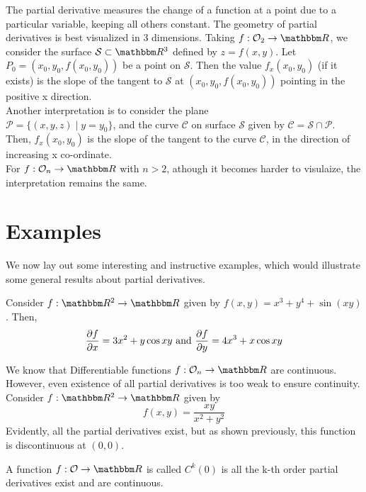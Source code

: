 \documentclass[../Analysis-3]{subfiles}
\begin{document}
The partial derivative measures the change of a function at a point due to a particular variable, keeping all others constant. The geometry of partial derivatives is best visualized in 3 dimensions. Taking $f: \mathcal{O}_2 \to \R$, we consider the surface $\mathcal{S} \subset \R^3$ defined by $z = f(x,y)$. Let $P_0 = (x_0, y_0, f(x_0, y_0))$ be a point on $\mathcal{S}$. Then the value $f_x(x_0, y_0)$ (if it exists) is the slope of the tangent to $\mathcal{S}$ at $(x_0, y_0, f(x_0, y_0))$ pointing in the positive x direction.\\
Another interpretation is to consider the plane \\
$\mathcal{P} = \{(x,y,z) \mid y = y_0\}$, and the curve $\mathcal{C}$ on surface $\mathcal{S}$ given by $\mathcal{C} = \mathcal{S} \cap \mathcal{P}$. Then, $f_x(x_0, y_0)$ is the slope of the tangent to the curve $\mathcal{C}$, in the direction of increasing x co-ordinate.\\
For $f: \mathcal{O}_n \to \R$ with $n > 2$, athough it becomes harder to visulaize, the interpretation remains the same.

\newpage

\section{Examples}

We now lay out some interesting and instructive examples, which would illustrate some general results about partial derivatives.

\begin{Eg}{}{}
    Consider $f: \R^2 \to \R$ given by $f(x,y) = x^3 + y^4 + \sin(xy)$. Then,
    $$\pdv{f}{x} = 3x^2 + y\cos{xy} \text{ and } \pdv{f}{y} = 4x^3 + x\cos{xy}$$
\end{Eg}

\begin{Eg}{}{}
    We know that Differentiable functions  $f: \mathcal{O}_n \to \R$ are continuous. However, even existence of all partial derivatives is too weak to ensure continuity.\\
    Consider $f: \R^2 \to \R$ given by
    $$f(x,y) = \frac{xy}{x^2 + y^2}$$
    Evidently, all the partial derivatives exist, but as shown previously, this function is discontinuous at $(0,0)$.
\end{Eg}

\begin{Def}{}{}
    A function $f: \mathcal{O} \to \R$ is called $C^k(\mathcal{0})$ is all the k-th order partial derivatives exist and are continuous.
\end{Def}
\end{document}
